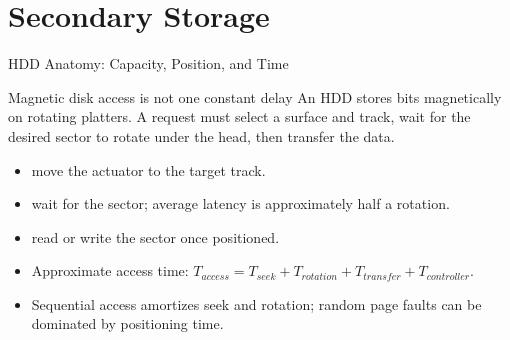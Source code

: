 \documentclass[aspectratio=169]{beamer}
\begin{document}

\section{Secondary Storage}

\begin{frame}{HDD Anatomy: Capacity, Position, and Time}
  \begin{block}{Magnetic disk access is not one constant delay}
    An HDD stores bits magnetically on rotating platters. A request must select
    a surface and track, wait for the desired sector to rotate under the head,
    then transfer the data.
  \end{block}
  \begin{itemize}
    \item {} move the actuator to the target track.
    \item {} wait for the sector; average latency is
      approximately half a rotation.
    \item {} read or write the sector once positioned.
    \item Approximate access time:
      $T_{access}=T_{seek}+T_{rotation}+T_{transfer}+T_{controller}$.
    \item Sequential access amortizes seek and rotation; random page faults
      can be dominated by positioning time.
  \end{itemize}
\end{frame}
\end{document}
